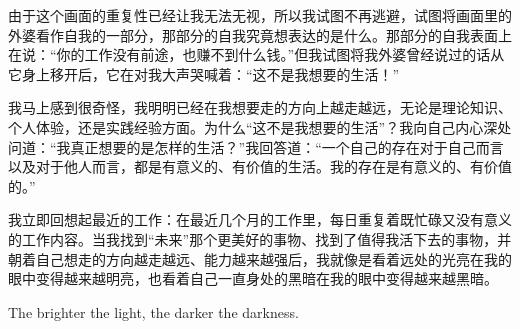 由于这个画面的重复性已经让我无法无视，所以我试图不再逃避，试图将画面里的外婆看作自我的一部分，那部分的自我究竟想表达的是什么。那部分的自我表面上在说：“你的工作没有前途，也赚不到什么钱。”但我试图将我外婆曾经说过的话从它身上移开后，它在对我大声哭喊着：“这不是我想要的生活！”

我马上感到很奇怪，我明明已经在我想要走的方向上越走越远，无论是理论知识、个人体验，还是实践经验方面。为什么“这不是我想要的生活”？我向自己内心深处问道：“我真正想要的是怎样的生活？”我回答道：“一个自己的存在对于自己而言以及对于他人而言，都是有意义的、有价值的生活。我的存在是有意义的、有价值的。”

我立即回想起最近的工作：在最近几个月的工作里，每日重复着既忙碌又没有意义的工作内容。当我找到“未来”那个更美好的事物、找到了值得我活下去的事物，并朝着自己想走的方向越走越远、能力越来越强后，我就像是看着远处的光亮在我的眼中变得越来越明亮，也看着自己一直身处的黑暗在我的眼中变得越来越黑暗。

The brighter the light, the darker the darkness.
